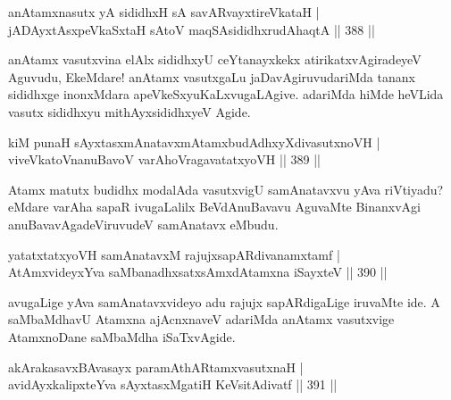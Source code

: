 
\begin{shl}
anAtamxnasutx yA sididhxH sA savAR\s vayxtireVkataH | \\
jADAyxtAsxpeVkaSxtaH sA\s toV maqSAsididhxrudAhaqtA \hfill||  388 ||  
\end{shl}

\begin{artha}
anAtamx vasutxvina elAlx sididhxyU ceYtanayxkekx atirikatxvAgiradeyeV Aguvudu, EkeMdare! anAtamx vasutxgaLu jaDavAgiruvudariMda tananx sididhxge inonxMdara apeVkeSxyuKaLxvugaLAgive. adariMda hiMde heVLida vasutx sididhxyu mithAyxsididhxyeV Agide.
\end{artha}


\begin{shl}
kiM punaH sAyxtasxmAnatavxmAtamxbudAdhxyXdivasutxnoVH | \\
viveVkatoV\s nanuBavoV varAhoVragavatatxyoVH \hfill||  389 ||  
\end{shl}

\begin{artha}
Atamx matutx budidhx modalAda vasutxvigU samAnatavxvu yAva riVtiyadu? eMdare varAha sapaR ivugaLalilx BeVdAnuBavavu AguvaMte BinanxvAgi anuBavavAgadeViruvudeV samAnatavx eMbudu.
\end{artha}


\begin{shl}
yatatxtatxyoVH samAnatavxM rajujxsapARdivanamxtamf | \\
AtAmxvideyxYva saMbanadhxsatxsAmxdAtamxna iSayxteV \hfill||  390 ||  
\end{shl}

\begin{artha}
avugaLige yAva samAnatavxvideyo adu rajujx sapARdigaLige iruvaMte ide. A saMbaMdhavU Atamxna ajAcnxnaveV  adariMda anAtamx vasutxvige AtamxnoDane saMbaMdha iSaTxvAgide.
\end{artha}


\begin{shl}
akArakasavxBAvasayx paramAthARtamxvasutxnaH | \\
avidAyxkalipxteYva sAyxtasxMgatiH KeV\s sitAdivatf \hfill||  391 ||  
\end{shl}

